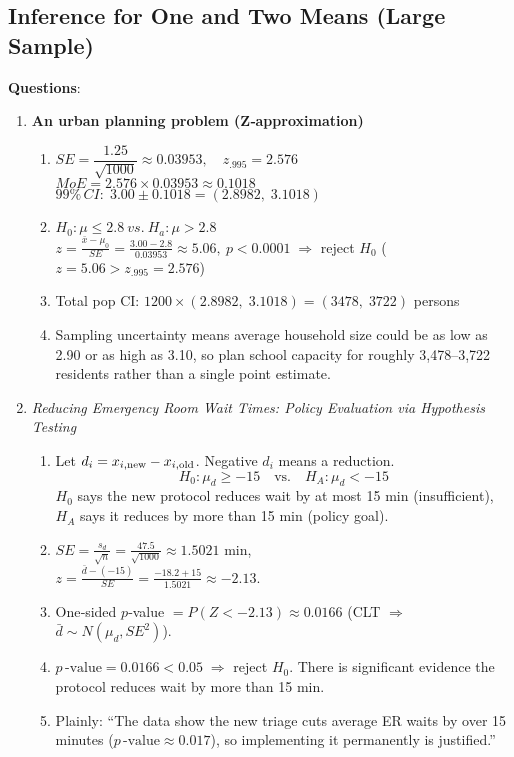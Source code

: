 \documentclass{article}
\begin{document}

\subsection{Inference for One and Two Means (Large Sample)}


\textbf{Questions}:
\begin{enumerate} %

\item \textbf{An urban planning problem (Z‐approximation)}
\begin{enumerate}[label=(\alph*)]
  \item
    $SE=\dfrac{1.25}{\sqrt{1000}}\approx0.03953,\quad z_{.995}=2.576$\\
    $MoE=2.576\times0.03953\approx0.1018$\\
    $99\%\,CI:\;3.00\pm0.1018=(2.8982,\;3.1018)$
  \item
    $H_0:\mu\le2.8\ vs.\ H_a:\mu>2.8$\\
    $z=\frac{\bar{x}-\mu_0}{SE}=\frac{3.00-2.8}{0.03953}\approx5.06,\ p\!<0.0001\;\Rightarrow$ reject $H_0$ ($z=5.06 > z_{.995}=2.576$)
  \item
    Total pop CI: $1200\times(2.8982,\;3.1018)=(3478,\;3722)$ persons
  \item
    Sampling uncertainty means average household size could be as low as 2.90 or as high as 3.10, so plan school capacity for roughly 3,478–3,722 residents rather than a single point estimate.
\end{enumerate}

\item \emph{Reducing Emergency Room Wait Times: Policy Evaluation via Hypothesis Testing}
\begin{enumerate}[label=(\alph*)]
  \item
    Let $d_i = x_{i,\rm new}-x_{i,\rm old}$.  Negative $d_i$ means a reduction.
    \[
      H_0:\mu_d \ge -15
      \quad\text{vs.}\quad
      H_A:\mu_d < -15
    \]
    $H_0$ says the new protocol reduces wait by at most 15 min (insufficient), $H_A$ says it reduces by more than 15 min (policy goal).
  \item
    $SE = \frac{s_d}{\sqrt{n}}=\frac{47.5}{\sqrt{1000}}\approx1.5021$ min,\\
    $z=\frac{\bar d-(-15)}{SE}=\frac{-18.2+15}{1.5021}\approx-2.13$.
  \item
    One‐sided $p$‑value $=P(Z<-2.13)\approx0.0166$ (CLT $\Rightarrow$ $\bar d\sim N(\mu_d,SE^2)$).
  \item
    $p\,\text{-value}=0.0166<0.05\;\Rightarrow$ reject $H_0$.  There is significant evidence the protocol reduces wait by more than 15 min.
  \item
    Plainly: “The data show the new triage cuts average ER waits by over 15 minutes ($p\,\text{-value}\approx0.017$), so implementing it permanently is justified.”
\end{enumerate}


\end{enumerate}
\end{document}
